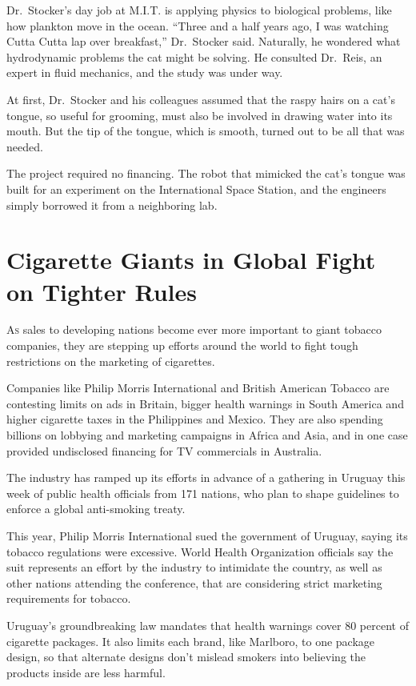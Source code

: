 ﻿\documentclass[12pt]{article}
\begin{document}
Dr.~Stocker's day job at M.I.T. is applying physics to biological problems, like how plankton move
in the ocean. ``Three and a half years ago, I was watching Cutta Cutta lap over breakfast,''
Dr.~Stocker said. Naturally, he wondered what hydrodynamic problems the cat might be solving. He
consulted Dr.~Reis, an expert in fluid mechanics, and the study was under way.

At first, Dr.~Stocker and his colleagues assumed that the raspy hairs on a cat's tongue, so useful
for grooming, must also be involved in drawing water into its mouth. But the tip of the tongue,
which is smooth, turned out to be all that was needed.

The project required no financing. The robot that mimicked the cat's tongue was built for an
experiment on the International Space Station, and the engineers simply borrowed it from a
neighboring lab.

\section{Cigarette Giants in Global Fight on Tighter Rules}

\lettrine{A}{s} sales to developing nations become ever more important to
giant tobacco companies, they are stepping up efforts around the world to fight tough restrictions
on the marketing of cigarettes.

Companies like Philip Morris International and British American Tobacco are contesting limits on ads
in Britain, bigger health warnings in South America and higher cigarette taxes in the Philippines
and Mexico. They are also spending billions on lobbying and marketing campaigns in Africa and Asia,
and in one case provided undisclosed financing for TV commercials in Australia.

The industry has ramped up its efforts in advance of a gathering in Uruguay this week of public
health officials from 171 nations, who plan to shape guidelines to enforce a global anti-smoking
treaty.

This year, Philip Morris International sued the government of Uruguay, saying its tobacco
regulations were excessive. World Health Organization officials say the suit represents an effort by
the industry to intimidate the country, as well as other nations attending the conference, that are
considering strict marketing requirements for tobacco.

Uruguay's groundbreaking law mandates that health warnings cover 80 percent of cigarette packages.
It also limits each brand, like Marlboro, to one package design, so that alternate designs don't
mislead smokers into believing the products inside are less harmful.
\end{document}
